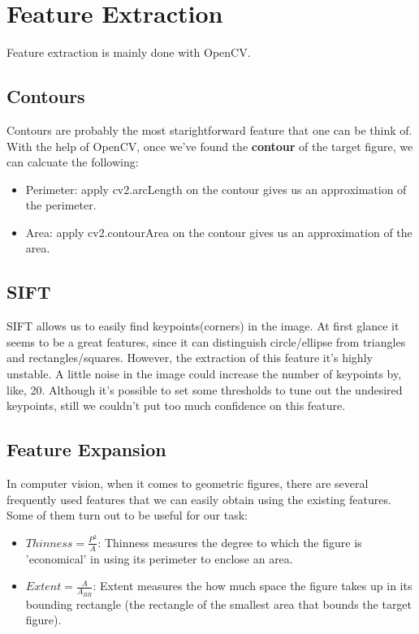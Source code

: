 \section{Feature Extraction}

Feature extraction is mainly done with OpenCV. 

\subsection{Contours}

Contours are probably the most starightforward feature that one can be think of. With the help of OpenCV, once we've found the \textbf{contour} of the target figure, we can calcuate the following:

\begin{itemize}
\item Perimeter: apply cv2.arcLength on the contour gives us an approximation of the perimeter.
\item Area: apply cv2.contourArea on the contour gives us an approximation of the area.
\end{itemize}

\subsection{SIFT}

SIFT allows us to easily find keypoints(corners) in the image. At first glance it seems to be a great features, since it can distinguish circle/ellipse from triangles and rectangles/squares. However, the extraction of this feature it's highly unstable. A little noise in the image could increase the number of keypoints by, like, 20. Although it's possible to set some thresholds to tune out the undesired keypoints, still we couldn't put too much confidence on this feature.

\subsection{Feature Expansion}

In computer vision, when it comes to geometric figures, there are several frequently used features that we can easily obtain using the existing features. Some of them turn out to be useful for our task:

\begin{itemize}
\item $Thinness = \frac{P^2}{A}$: Thinness measures the degree to which the figure is 'economical' in using its perimeter to enclose an area. 
\item $Extent = \frac{A}{A_{BR}}$: Extent measures the how much space the figure takes up in its bounding rectangle (the rectangle of the smallest area that bounds the target figure).
\end{itemize}

